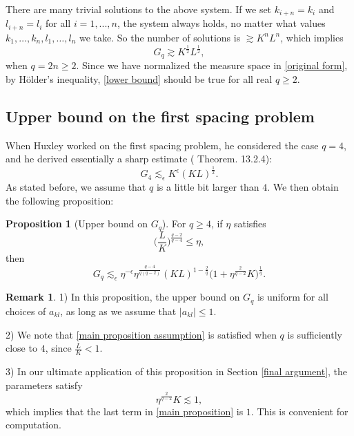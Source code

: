 \documentclass[11pt]{amsart}
\numberwithin{equation}{section}
\theoremstyle{definition}
\newtheorem{remark}[theorem]{Remark}
\theoremstyle{proposition}
\newtheorem{proposition}{Proposition}[section]
\begin{document}
There are many trivial solutions to the above system. If we set $k_{i+n}=k_i$ and $l_{i+n}=l_i$ for all $i=1,...,n$, the system always holds, no matter what values $k_1,\dots,k_n,l_1,\dots,l_n$ we take. So the number of solutions is $\gtrsim K^n L^n$, which implies 
\begin{equation}  \label{lower bound}
G_q\gtrsim K^{\frac{1}{2}} L^{\frac{1}{2}},  
\end{equation}
when $q=2n\ge 2$. Since we have normalized the measure space in \eqref{original form}, by Hölder's inequality, \eqref{lower bound} should be true for all real $q\ge 2$.  

\subsection{Upper bound on the first spacing problem}

When Huxley worked on the first spacing problem, he considered the case $q=4$, and he derived essentially a sharp estimate (\cite{Huxley1996} Theorem. 13.2.4):
\[
G_4 \lesssim_{\epsilon} K^\epsilon (KL)^{\frac{1}{2}}. 
\]
As stated before, we assume that $q$ is a little bit larger than $4$. We then obtain the following proposition: 
\begin{proposition}[Upper bound on $G_q$]  \label{main proposition statment} 
For $q\ge 4$, if $\eta$ satisfies   
\begin{equation}  \label{main proposition assumption}
\Big(\frac{L}{K}\Big)^{\frac{q-2}{q-4}}\le \eta,    
\end{equation}
then
\begin{equation}    \label{main proposition}
G_q \lesssim_\epsilon \eta^{-\epsilon} \eta^{\frac{q-4}{q(q-2)}} (KL)^{1-\frac{2}{q}}\Big(1+\eta^{\frac{2}{q-2}}K\Big)^{\frac{1}{q}}.    
\end{equation}
\end{proposition}
\begin{remark}
1) In this proposition, the upper bound on $G_q$ is uniform for all choices of $a_{kl}$, as long as we assume that $|a_{kl}|\le 1$. 

2) We note that \eqref{main proposition assumption} is satisfied when $q$ is sufficiently close to $4$, since $\frac{L}{K}< 1$.

3) In our ultimate application of this proposition in Section \ref{final argument}, the parameters satisfy
\[
\eta^{\frac{2}{q-2}}K \lesssim 1,
\]
which implies that the last term in \eqref{main proposition} is $1$. This is convenient for computation.
\end{remark}
\end{document}
